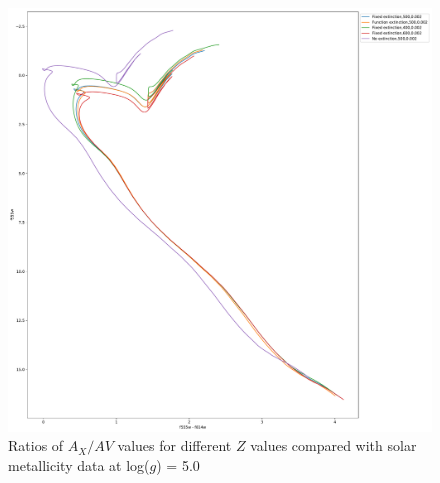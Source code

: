 \documentclass[12pt, a4paper]{report}
\begin{document}
\begin{figure}[h]
\begin{center}
\includegraphics[scale=0.3]{../basti_isochrones_10_13Gyr/Extinction_T5k_FeH0fix_func_f555w_f555wmf814w_500_400_600_Myr_FeH_0p002_ref_noext_Av_1p0.pdf}
\caption{Ratios of $A_{X}/A{V}$ values for different $Z$ values compared with solar metallicity data at log($g$) = 5.0}
\label{wfc3_isoc1_T5k}
\end{center}
\end{figure}
\end{document}
